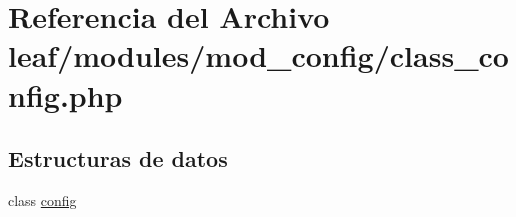 \hypertarget{class__config_8php}{\section{Referencia del Archivo leaf/modules/mod\-\_\-config/class\-\_\-config.php}
\label{class__config_8php}
}
\subsection*{Estructuras de datos}
\begin{DoxyCompactItemize}
\item 
class \hyperlink{classconfig}{config}
\end{DoxyCompactItemize}
